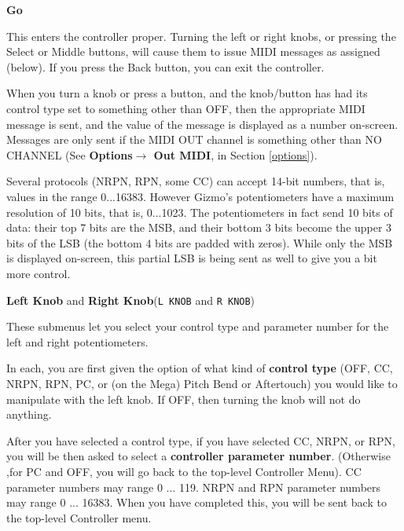 \documentclass{article}
\begin{document}
	\begin{description}

	\item{\bf Go}
	
	This enters the controller proper.  Turning the left or right knobs, or pressing the Select or Middle buttons, will cause them to issue MIDI messages as assigned (below).  If you press the Back button, you can exit the controller.
	
	When you turn a knob or press a button, and the knob/button has had its control type set to something other than OFF, then the appropriate MIDI message is sent, and the value of the message is displayed as a number on-screen.  Messages are only sent if the MIDI OUT channel is something other than NO CHANNEL (See {\bf Options\(\boldsymbol\rightarrow\) Out MIDI}, in Section \ref{options}).
	
	Several protocols (NRPN, RPN, some CC) can accept 14-bit numbers, that is, values in the range 0...16383.  However Gizmo's potentiometers have a maximum resolution of 10 bits, that is, 0...1023.   The potentiometers in fact send 10 bits of data: their top 7 bits are the MSB, and their bottom 3 bits become the upper 3 bits of the LSB (the bottom 4 bits are padded with zeros).   While only the MSB is displayed on-screen, this partial LSB is being sent as well to give you a bit more control.  %

	\item{\bf Left Knob} and {\bf Right Knob}\quad (\texttt{L KNOB} and \texttt{R KNOB})
	
	These submenus let you select your control type and parameter number for the left and right potentiometers.
	
	In each, you are first given the option of what kind of {\bf control type} (OFF, CC, NRPN, RPN, PC, or (on the Mega) Pitch Bend or Aftertouch)%
you would like to manipulate with the left knob.  If OFF, then turning the knob will not do anything.

	After you have selected a control type, if you have selected CC, NRPN, or RPN, you will be then asked to select a {\bf controller parameter number}.  (Otherwise ,for PC and OFF, you will go back to the top-level Controller Menu).  CC parameter numbers may range 0 ... 119.  NRPN and RPN parameter numbers may range 0 ... 16383. When you have completed this, you will be sent back to the top-level Controller menu.


\end{description}
\end{document}
